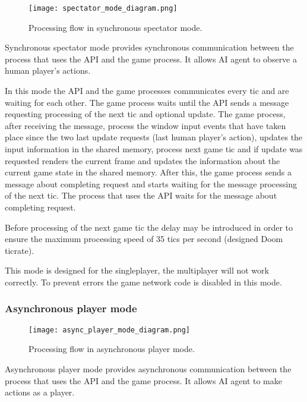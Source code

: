 	    \begin{figure}
			    \centering
			    \texttt{[image: spectator\_mode\_diagram.png]}
			    \caption{Processing flow in synchronous spectator mode.}\label{fig:spectator_mode_diagram}
	    \end{figure}
	    
	    Synchronous spectator mode provides synchronous communication between the process that uses the API and the game process. It allows AI agent to observe a human player's actions. 
	    
	    In this mode the API and the game processes communicates every tic and are waiting for each other. The game process waits until the API sends a message requesting processing of the next tic and optional update. The game process, after receiving the message, process the window input events that have taken place since the two last update requests (last human player's action), updates the input information in the shared memory, process next game tic and if update was requested renders the current frame and updates the information about the current game state in the shared memory. After this, the game process sends a message about completing request and starts waiting for the message processing of the next tic. The process that uses the API waits for the message about completing request.

        Before processing of the next game tic the delay may be introduced in order to ensure the maximum processing speed of 35 tics per second (designed Doom ticrate).
        
        This mode is designed for the singleplayer, the multiplayer will not work correctly. To prevent errors the game network code is disabled in this mode.

    \subsubsection{Asynchronous player mode}\label{sec:architecture_async_player_mode}

	    \begin{figure}
			    \centering
			    \texttt{[image: async\_player\_mode\_diagram.png]}
			    \caption{Processing flow in asynchronous player mode.}\label{fig:async_player_mode_diagram}
	    \end{figure}
	    
	    Asynchronous player mode provides asynchronous communication between the process that uses the API and the game process. It allows AI agent to make actions as a player. 
	    
